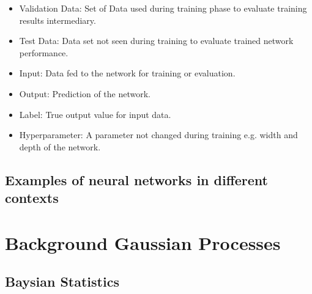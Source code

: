 \begin{itemize}
		\item Validation Data: Set of Data used during training phase to evaluate training results intermediary. \\
		\item Test Data: Data set not seen during training to evaluate trained network performance. \\
		\item Input: Data fed to the network for training or evaluation.
		\item Output: Prediction of the network.
		\item Label: True output value for input data.
		\item Hyperparameter: A parameter not changed during training e.g. width and depth of the network.
	\end{itemize}
	\section{Examples of neural networks in different contexts}
\chapter{Background Gaussian Processes}
	\section{Baysian Statistics}